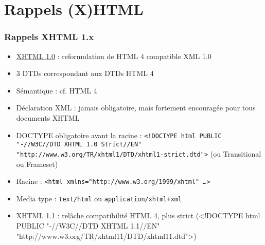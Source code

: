 \documentclass[english, french]{beamer}
\begin{document}
\appendix
\AtBeginSection{
}
\section{Rappels (X)HTML}
\begin{frame}
	\frametitle{Rappels XHTML 1.x}
	\begin{itemize}
		\item \href{https://www.w3.org/TR/xhtml1/}{XHTML 1.0} : reformulation de HTML 4 compatible XML 1.0
		\item 3 DTDs correspondant aux DTDs HTML 4
		\item Sémantique : cf. HTML 4
		\item Déclaration XML : jamais obligatoire, mais fortement encouragée pour tous documents XHTML
		\item DOCTYPE obligatoire avant la racine : \texttt{\small{<!DOCTYPE html PUBLIC "-//W3C//DTD XHTML 1.0 Strict//EN" "http://www.w3.org/TR/xhtml1/DTD/xhtml1-strict.dtd">}} {\tiny (ou Transitional ou Frameset)}%
		\item Racine : \texttt{\small{<html xmlns="http://www.w3.org/1999/xhtml" …>}}%
		\item Media type : \texttt{text/html} ou \texttt{application/xhtml+xml}
		\item XHTML 1.1 : relâche compatibilité HTML 4, plus strict {\tiny (<!DOCTYPE html PUBLIC "-//W3C//DTD XHTML 1.1//EN" "http://www.w3.org/TR/xhtml11/DTD/xhtml11.dtd">)}
	\end{itemize}
\end{frame}
\end{document}
